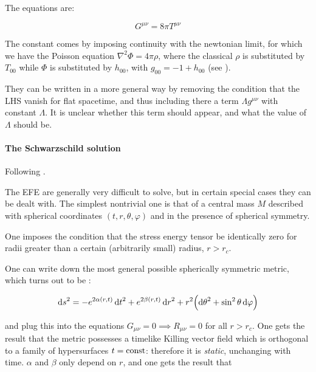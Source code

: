 \documentclass[main.tex]{subfiles}
\begin{document}
The equations are:

\begin{equation} \label{eq:EFE}
  G^{\mu\nu} = 8 \pi T^{\mu\nu}
\end{equation}

The constant comes by imposing continuity with the newtonian limit, for which we have the Poisson equation \(\nabla^2 \Phi = 4 \pi \rho\), where the classical \(\rho\) is substituted by \(T_{00}\) while \(\Phi\) is substituted by \(h_{00}\), with \(g_{00} = - 1 + h_{00}\) (see \cite[eq. 4.46]{Carroll:1997ar}).

They can be written in a more general way by removing the condition that the LHS vanish for flat spacetime, and thus including there a term \(\Lambda g^{\mu\nu}\) with constant \(\Lambda\).
It is unclear whether this term should appear, and what the value of \(\Lambda\) should be.

\paragraph{The Schwarzschild solution}

Following \cite[section 7]{Carroll:1997ar}.

The EFE are generally very difficult to solve, but in certain special cases they can be dealt with. The simplest nontrivial one is that of a central mass \(M\) described with spherical coordinates \((t, r, \theta, \varphi)\) and in the presence of spherical symmetry.

One imposes the condition that the stress energy tensor be identically zero for radii greater than a certain (arbitrarily small) radius, \(r > r_c\).

One can write down the most general possible spherically symmetric metric, which turns out to be \cite[eq. 7.13]{Carroll:1997ar}:

\begin{equation}
  \dd{s} ^2 = -e^{2 \alpha(r, t)} \dd{t}^2 + e^{2 \beta(r, t)} \dd{r}^2
  + r^2 \qty(\dd{\theta}^2 + \sin^2\theta \dd{\varphi})
\end{equation}

and plug this into the equations \(G_{\mu\nu} = 0 \implies R_{\mu\nu} = 0 \) for all \(r>r_c\). One gets the result that the metric possesses a timelike Killing vector field which is orthogonal to a family of hypersurfaces \(t = \operatorname{const}\): therefore it is \emph{static}, unchanging with time.
\(\alpha\) and \(\beta\) only depend on \(r\), and one gets the result that
\end{document}
